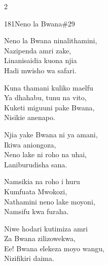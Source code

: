 \documentclass{article}
\begin{document}
\begin{multicols}{2}
\begin{hymn}{181}{Neno la Bwana}{\#29}
\begin{stanza}
Neno la Bwana ninalithamini,\\
Nazipenda amri zake,\\
Linanisaidia kuona njia\\
Hadi mwisho wa safari.
\end{stanza}
\begin{chorus}
Kuna thamani kuliko maelfu\\
Ya dhahabu, tunu na vito,\\
Kuketi miguuni pake Bwana,\\
Nisikie anenapo.
\end{chorus}
\begin{stanza}
Njia yake Bwana ni ya amani,\\
Ikiwa aniongoza,\\
Neno lake ni roho na uhai,\\
Laniburudisha sana.
\end{stanza}
\begin{stanza}
Namsikia na roho i huru\\
Kumfuata Mwokozi,\\
Nathamini neno lake moyoni,\\
Namsifu kwa furaha.
\end{stanza}
\begin{stanza}
Niwe hodari kutimiza amri\\
Za Bwana zilizowekwa,\\
Ee! Bwana elekeza moyo wangu,\\
Nizifikiri daima.
\end{stanza}
\end{hymn}


\end{multicols}
\end{document}
